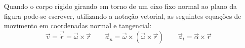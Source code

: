 \documentclass{article}
\begin{document}
            Quando o corpo rígido girando em torno de um eixo fixo normal ao plano da figura pode-se escrever, utilizando a notação vetorial, as seguintes equações de movimento em coordenadas normal e tangencial:
                \begin{equation}
                    \boxed{
                        \vec{v} = \vec{\dot{r}} = \vec{\omega}\times\vec{r}
                    }
                    \qquad
                    \boxed{
                        \vec{a}_{n} = \vec{\omega} \times (\vec{\omega}\times\vec{r})
                    }
                    \qquad
                    \boxed{
                        \vec{a}_{t} = \vec{\alpha} \times \vec{r}
                    }
                \end{equation}
\end{document}
